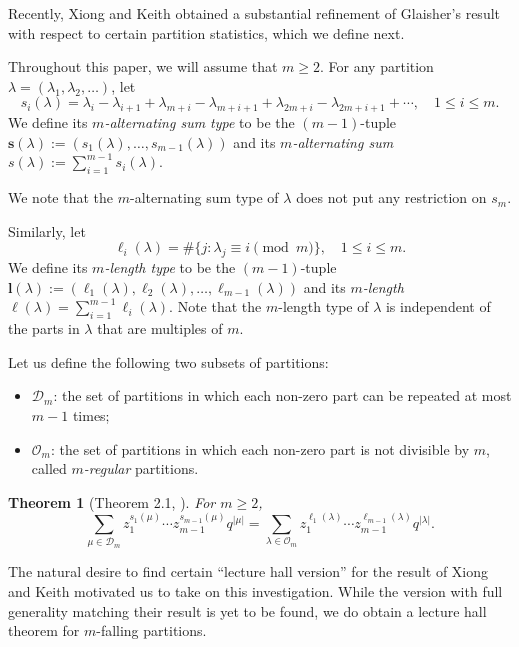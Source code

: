 \documentclass[11pt,reqno]{amsart}
\numberwithin{equation}{section}
\theoremstyle{plain}
\newtheorem{theorem}{Theorem}[section]
\theoremstyle{definition}
\newcommand{\D}{\mathcal{D}}
\newcommand{\OO}{\mathcal{O}}
\newcommand{\sbf}{\mathbf{s}}
\newcommand{\lbf}{\mathbf{l}}
\begin{document}
Recently, Xiong and Keith \cite{KX} obtained a substantial refinement of Glaisher's result with respect to certain partition statistics, which we define next.

Throughout this paper, we will assume that $m\ge 2$.  For any partition $\lambda=(\lambda_1,\lambda_2,\ldots)$, let
$$s_i(\lambda)=\lambda_i-\lambda_{i+1}+\lambda_{m+i}-\lambda_{m+i+1}+\lambda_{2m+i}-\lambda_{2m+i+1}+\cdots, \quad 1\le i\le m.$$
We define its \emph{$m$-alternating sum type} to be the $(m-1)$-tuple $\sbf(\lambda):=(s_1(\lambda),\ldots,s_{m-1}(\lambda))$ and its \emph{$m$-alternating sum} $s(\lambda):=\sum_{i=1}^{m-1} s_i(\lambda)$.

We  note that the $m$-alternating sum type of $\lambda$ does not put any restriction on $s_m$. 

Similarly, let
$$
\ell_i(\lambda)=\#\{j:\lambda_j\equiv i \pmod m\}, \quad 1\le i\le m.
$$
We define its \emph{$m$-length type} to be the $(m-1)$-tuple $\lbf(\lambda):=(\ell_1(\lambda),\ell_2(\lambda),\ldots,\ell_{m-1}(\lambda))$ and its \emph{$m$-length} $\ell(\lambda)=\sum_{i=1}^{m-1}\ell_i(\lambda)$.
Note that the $m$-length type of $\lambda$ is independent of the parts in $\lambda$ that are multiples of $m$. 

Let us define the following two subsets of partitions:
\begin{itemize}
		\item $\D_m$: the set of partitions in which each non-zero part can be repeated at most $m-1$ times;
		\item $\OO_m$: the set of partitions in which each non-zero part is not divisible by $m$, called \emph{$m$-regular} partitions.
	
	
	
\end{itemize}


\begin{theorem}[Theorem 2.1, \cite{KX}]\label{KXthm}
For $m\ge 2$,
\begin{equation*}
\sum_{\mu \in \D_m} z_1^{s_1(\mu)} \cdots z_{m-1}^{s_{m-1}(\mu)} q^{|\mu |} =\sum_{\lambda \in \OO_m} z_1^{\ell_1(\lambda)} \cdots z_{m-1}^{\ell_{m-1}(\lambda)}q^{|\lambda|}.

\end{equation*}
\end{theorem}


The natural desire to find certain ``lecture hall version'' for the result of Xiong and Keith motivated us to take on this investigation. While the version with full generality matching their result is yet to be found, we do obtain a lecture hall theorem for $m$-falling partitions.
\end{document}
